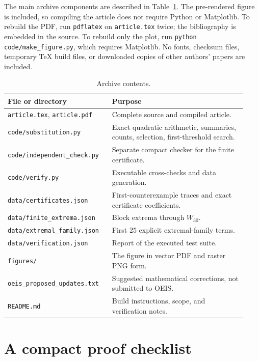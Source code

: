 \documentclass[11pt]{article}
\numberwithin{equation}{section}
\theoremstyle{definition}
\theoremstyle{remark}
\begin{document}
The main archive components are described in Table~\ref{tab:files}.
The pre-rendered figure is included, so compiling the article does not
require Python or Matplotlib. To rebuild the PDF, run \texttt{pdflatex}
on \texttt{article.tex} twice; the bibliography is embedded in the source.
To rebuild only the plot, run \texttt{python code/make\_figure.py}, which
requires Matplotlib. No fonts, checksum files, temporary TeX build files,
or downloaded copies of other authors' papers are included.

\begin{table}[htbp]
\centering\small
\begin{tabular}{p{0.40\linewidth}p{0.53\linewidth}}
\toprule
File or directory & Purpose\\
\midrule
\texttt{article.tex}, \texttt{article.pdf} & Complete source and compiled article.\\
\texttt{code/substitution.py} & Exact quadratic arithmetic, summaries, counts, selection, first-threshold search.\\
\texttt{code/independent\_check.py} & Separate compact checker for the finite certificate.\\
\texttt{code/verify.py} & Executable cross-checks and data generation.\\
\texttt{data/certificates.json} & First-counterexample traces and exact certificate coefficients.\\
\texttt{data/finite\_extrema.json} & Block extrema through $W_{30}$.\\
\texttt{data/extremal\_family.json} & First $25$ explicit extremal-family terms.\\
\texttt{data/verification.json} & Report of the executed test suite.\\
\texttt{figures/} & The figure in vector PDF and raster PNG form.\\
\texttt{oeis\_proposed\_updates.txt} & Suggested mathematical corrections, not submitted to OEIS.\\
\texttt{README.md} & Build instructions, scope, and verification notes.\\
\bottomrule
\end{tabular}
\caption{Archive contents.}\label{tab:files}
\end{table}

\section{A compact proof checklist}
\label{qmw:app:checklist}
\end{document}
